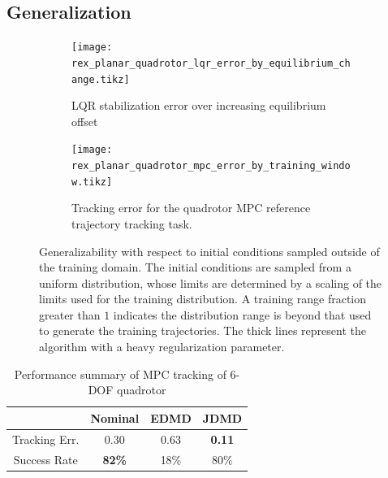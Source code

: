 \documentclass{article}
\begin{document}
\subsection{Generalization}
\begin{figure}[t] \centering
  \begin{subfigure}[t]{0.49\textwidth}
    \centering
    \texttt{[image: rex\_planar\_quadrotor\_lqr\_error\_by\_equilibrium\_change.tikz]}
    \caption{LQR stabilization error over increasing equilibrium offset}
    \label{fig:rex_planar_quadrotor_lqr_error_by_equilibrium_change}
  \end{subfigure}
  \hfill
  \begin{subfigure}[t]{0.48\textwidth}
    \raggedright
    \texttt{[image: rex\_planar\_quadrotor\_mpc\_error\_by\_training\_window.tikz]}
    \caption{Tracking error for the quadrotor MPC reference trajectory tracking task.}
    \label{fig:rex_planar_quadrotor_mpc_error_by_training_window}
  \end{subfigure}
  \caption{Generalizability with respect to initial conditions sampled outside of the 
  training domain. The initial conditions are sampled from a uniform distribution, whose 
  limits are determined by a scaling of the limits used for the training distribution. 
  A training range fraction greater than $1$ indicates the
  distribution range is beyond that used to generate the training trajectories. The thick 
  lines represent the algorithm with a heavy regularization parameter.
  }
  \label{fig:training_window}
\end{figure}
\begin{table}
	\vspace{-1\baselineskip}
	\begin{tabular}{cccc}\\
		\toprule  
								& {\color{black} \textbf{Nominal}} & {\color{orange} \textbf{EDMD}} & {\textbf{\color{cyan} JDMD}} \\
		\midrule
		Tracking Err.		& 0.30			& 0.63 	& \textbf{0.11} \\
		Success Rate 			& \textbf{82\%} & 18\%	& 80\% \\
		\bottomrule
	\end{tabular}
	\caption{Performance summary of MPC tracking of 6-DOF quadrotor}
	\vspace{-1\baselineskip}
	\label{tab:full_quad_tracking_mpc}
\end{table} 
\end{document}
